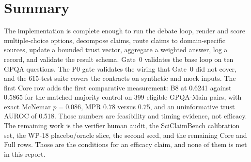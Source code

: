 \section{Summary}\label{sec:implementation-summary}

The implementation is complete enough to run the debate loop, render and score multiple-choice options, decompose claims, route claims to domain-specific sources, update a bounded trust vector, aggregate a weighted answer, log a record, and validate the result schema. Gate~0 validates the base loop on ten GPQA questions. The P0 gate validates the wiring that Gate~0 did not cover, and the 615-test suite covers the contracts on synthetic and mock inputs. The first Core row adds the first comparative measurement: B8 at 0.6241 against 0.5865 for the matched majority control on 399 eligible GPQA-Main pairs, with exact McNemar $p=0.086$, MPR 0.78 versus 0.75, and an uninformative trust AUROC of 0.518. Those numbers are feasibility and timing evidence, not efficacy. The remaining work is the verifier human audit, the SciClaimBench calibration set, the WP-18 placebo/oracle slice, the second seed, and the remaining Core and Full rows. Those are the conditions for an efficacy claim, and none of them is met in this report.
